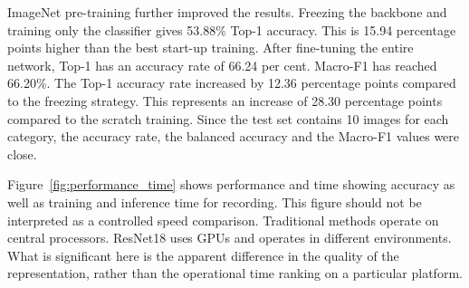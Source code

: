 ImageNet pre-training further improved the results. Freezing the backbone and
training only the classifier gives 53.88\% Top-1 accuracy. This is 15.94
percentage points higher than the best start-up training. After fine-tuning
the entire network, Top-1 has an accuracy rate of 66.24 per cent. Macro-F1 has
reached 66.20\%. The Top-1 accuracy rate increased by 12.36 percentage points
compared to the freezing strategy. This represents an increase of 28.30
percentage points compared to the scratch training. Since the test set
contains 10 images for each category, the accuracy rate, the balanced accuracy
and the Macro-F1 values were close.

\begin{table}[t]
  \centering
  \caption{The limited data results are from the unified 5,000 image test set.
  The remaining values are percentages except for time. As different
  hardware is used for operations, these times should not be compared as
  controlled speed benchmarks.}
  \label{tab:main_results}
\end{table}

Figure~\ref{fig:performance_time} shows performance and time showing accuracy
as well as training and inference time for recording. This figure should not
be interpreted as a controlled speed comparison. Traditional methods operate
on central processors. ResNet18 uses GPUs and operates in different
environments. What is significant here is the apparent difference in the
quality of the representation, rather than the operational time ranking on a
particular platform.

